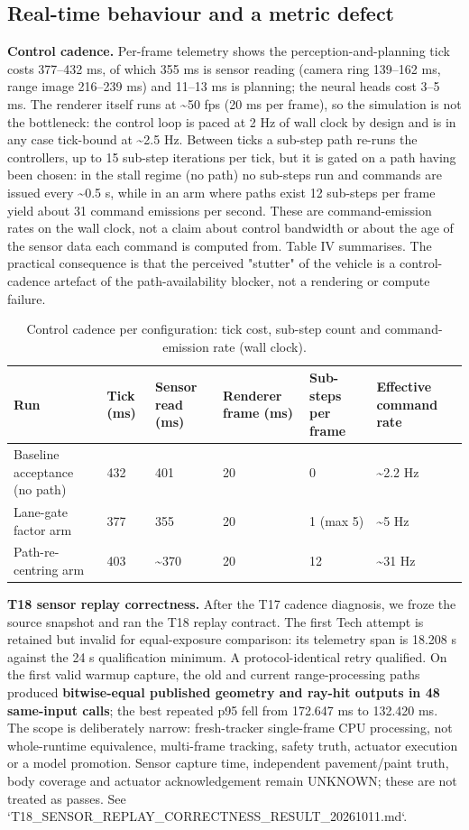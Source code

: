 \documentclass[journal]{IEEEtran}
\begin{document}
\subsection{Real-time behaviour and a metric defect}
\textbf{Control cadence.} Per-frame telemetry shows the perception-and-planning tick costs 377--432 ms, of
which 355 ms is sensor reading (camera ring 139--162 ms, range image 216--239 ms) and 11--13 ms is
planning; the neural heads cost 3--5 ms. The renderer itself runs at \textasciitilde{}50 fps (20 ms per frame), so the
simulation is not the bottleneck: the control loop is paced at 2 Hz of wall clock by design and is in any
case tick-bound at \textasciitilde{}2.5 Hz. Between ticks a sub-step path re-runs the controllers, up to 15 sub-step
iterations per tick, but it is gated on a path having been chosen: in the stall regime (no path) no sub-steps
run and commands are issued every \textasciitilde{}0.5 s, while in an arm where paths exist 12 sub-steps per frame yield
about 31 command emissions per second. These are command-emission rates on the wall clock, not a claim about
control bandwidth or about the age of the sensor data each command is computed from. Table IV summarises. The practical consequence is that the perceived "stutter" of the
vehicle is a control-cadence artefact of the path-availability blocker, not a rendering or compute
failure.
\begin{table}[!t]
\centering
\caption{Control cadence per configuration: tick cost, sub-step count and command-emission rate
(wall clock).}
\begin{tabular}{@{}llllll@{}}
\toprule
Run & Tick (ms) & Sensor read (ms) & Renderer frame (ms) & Sub-steps per frame & Effective command rate \\
\midrule
Baseline acceptance (no path) & 432 & 401 & 20 & 0 & \textasciitilde{}2.2 Hz \\
Lane-gate factor arm & 377 & 355 & 20 & 1 (max 5) & \textasciitilde{}5 Hz \\
Path-re-centring arm & 403 & \textasciitilde{}370 & 20 & 12 & \textasciitilde{}31 Hz \\
\bottomrule
\end{tabular}
\end{table}
\textbf{T18 sensor replay correctness.} After the T17 cadence diagnosis, we froze the source snapshot and ran the T18 replay contract. The first Tech attempt is retained but invalid for equal-exposure comparison: its telemetry span is 18.208 s against the 24 s qualification minimum. A protocol-identical retry qualified. On the first valid warmup capture, the old and current range-processing paths produced \textbf{bitwise-equal published geometry and ray-hit outputs in 48 same-input calls}; the best repeated p95 fell from 172.647 ms to 132.420 ms. The scope is deliberately narrow: fresh-tracker single-frame CPU processing, not whole-runtime equivalence, multi-frame tracking, safety truth, actuator execution or a model promotion. Sensor capture time, independent pavement/paint truth, body coverage and actuator acknowledgement remain UNKNOWN; these are not treated as passes. See `T18_SENSOR_REPLAY_CORRECTNESS_RESULT_20261011.md`.
\end{document}
